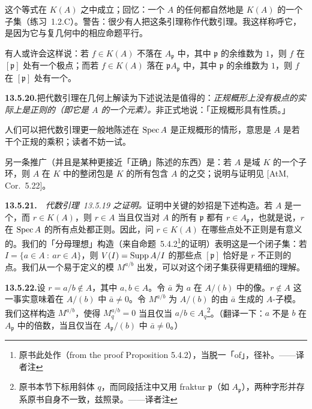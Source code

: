 这个等式在 $K(A)$ 之中成立；回忆：一个\trIntegralDomain{} $A$ 的任何\trLocalization{}都自然地是 $K(A)$ 的一个子集（\mbox{练习~1.2.C}）。警告：很少有人把这条引理称作代数\trHartogs{}引理。我这样称呼它，是因为它与复几何中的相应命题平行。

有人或许会这样说：若 $f\in K(A)$ 不落在 $A_{\mathfrak{p}}$ 中，其中 $\mathfrak{p}$ 的余维数为 $1$，则 $f$ 在 $[\mathfrak{p}]$ 处有一个极点；而若 $f\in K(A)$ 落在 $\mathfrak{p}A_{\mathfrak{p}}$ 中，其中 $\mathfrak{p}$ 的余维数为 $1$，则 $f$ 在 $[\mathfrak{p}]$ 处有一个\trZeros。

\textbf{13.5.20.}\quad 把代数\trHartogs{}引理在几何上解读为下述说法是值得的：\emph{\trNoetherian{}正规概形上没有极点的\trRationalFunction{}实际上是正则的（即它是 $A$ 的一个元素）。}非正式地说：「\trNoetherian{}正规概形具有\trHartogs{}性质。」

人们可以把代数\trHartogs{}引理更一般地陈述在 $\operatorname{Spec} A$ 是\trNoetherian{}正规概形的情形，意思是 $A$ 是若干个\trNoetherian{}正规\trIntegralDomain{}的乘积；读者不妨一试。

另一条推广（并且是某种更接近「正确」陈述的东西）是：若 $A$ 是域 $K$ 的一个子环，则 $A$ 在 $K$ 中的整闭包是 $K$ 的所有包含 $A$ 的\trValuationRing{}之交；说明与证明见 [AtM, Cor.~5.22]。

\textbf{13.5.21.}\ \hard\ \emph{代数\trHartogs{}引理~13.5.19 之证明。}\quad 证明中关键的妙招是下述构造。若 $A$ 是一个\trIntegralDomain，而 $r\in K(A)$，则 $r\in A$ 当且仅当对 $A$ 的所有\trPrimeIdeal{} $\mathfrak{p}$ 都有 $r\in A_{\mathfrak{p}}$，也就是说，$r$ 在 $\operatorname{Spec} A$ 的所有点处都正则。因此，问 $r\in K(A)$ 在哪些点处不正则是有意义的。我们的「分母理想」构造（来自命题~5.4.2\footnote{原书此处作（from the proof Proposition 5.4.2），当脱一「of」，径补。——译者注}的证明）表明这是一个闭子集：若 $I=\{a\in A\ :\ ar\in A\}$，则 $V(I)=\operatorname{Supp} A/I$ 的那些点 $[\mathfrak{p}]$ 恰好是 $r$ 不正则的点。我们从一个易于定义的模 $M^{a/b}$ 出发，可以对这个闭子集获得更精细的理解。

\textbf{13.5.22.}\quad 设 $r=a/b\notin A$，其中 $a,b\in A$。令 $\bar{a}$ 为 $a$ 在 $A/(b)$ 中的像。$r\notin A$ 这一事实意味着在 $A/(b)$ 中 $\bar{a}\neq0$。令 $M^{a/b}$ 为 $A/(b)$ 的由 $\bar{a}$ 生成的 $A$-子模。我们这样构造 $M^{a/b}$，使得 $M^{a/b}_q=0$ 当且仅当 $a/b\in A_q$\footnote{原书本节下标用斜体 $q$，而同段括注中又用 fraktur $\mathfrak{p}$（如 $A_{\mathfrak{p}}$），两种字形并存系原书自身不一致，兹照录。——译者注}。（翻译一下：$a$ 不是 $b$ 在 $A_{\mathfrak{p}}$ 中的倍数，当且仅当在 $A_{\mathfrak{p}}/(b)$ 中 $\bar{a}\neq0$。）

